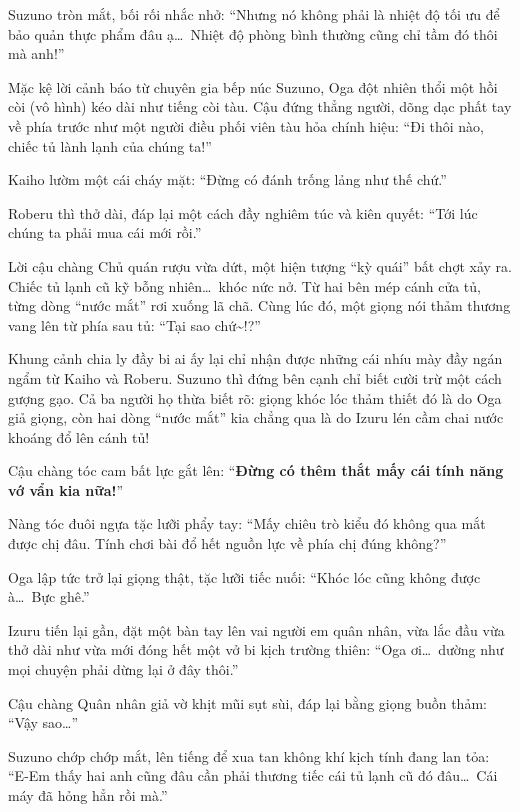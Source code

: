 \documentclass[../main.tex]{subfiles}
\begin{document}
Suzuno tròn mắt, bối rối nhắc nhở: ``Nhưng nó không phải là nhiệt độ tối ưu để bảo quản thực phẩm đâu ạ\dots\ Nhiệt độ phòng bình thường cũng chỉ tầm đó thôi mà anh!''

Mặc kệ lời cảnh báo từ chuyên gia bếp núc Suzuno, Oga đột nhiên thổi một hồi còi (vô hình) kéo dài như tiếng còi tàu. Cậu đứng thẳng người, dõng dạc phất tay về phía trước như một người điều phối viên tàu hỏa chính hiệu: ``Đi thôi nào, chiếc tủ lành lạnh của chúng ta!''


Kaiho lườm một cái cháy mặt: ``Đừng có đánh trống lảng như thế chứ.''

Roberu thì thở dài, đáp lại một cách đầy nghiêm túc và kiên quyết: ``Tới lúc chúng ta phải mua cái mới rồi.''

Lời cậu chàng Chủ quán rượu vừa dứt, một hiện tượng ``kỳ quái'' bất chợt xảy ra. Chiếc tủ lạnh cũ kỹ bỗng nhiên\dots\ khóc nức nở. Từ hai bên mép cánh cửa tủ, từng dòng ``nước mắt'' rơi xuống lã chã. Cùng lúc đó, một giọng nói thảm thương vang lên từ phía sau tủ: ``Tại sao chứ\~{}!?''

Khung cảnh chia ly đầy bi ai ấy lại chỉ nhận được những cái nhíu mày đầy ngán ngẩm từ Kaiho và Roberu. Suzuno thì đứng bên cạnh chỉ biết cười trừ một cách gượng gạo. Cả ba người họ thừa biết rõ: giọng khóc lóc thảm thiết đó là do Oga giả giọng, còn hai dòng ``nước mắt'' kia chẳng qua là do Izuru lén cầm chai nước khoáng đổ lên cánh tủ!

Cậu chàng tóc cam bất lực gắt lên: ``\textbf{Đừng có thêm thắt mấy cái tính năng vớ vẩn kia nữa!}''


Nàng tóc đuôi ngựa tặc lưỡi phẩy tay: ``Mấy chiêu trò kiểu đó không qua mắt được chị đâu. Tính chơi bài đổ hết nguồn lực về phía chị đúng không?''

Oga lập tức trở lại giọng thật, tặc lưỡi tiếc nuối: ``Khóc lóc cũng không được à\dots\ Bực ghê.''

Izuru tiến lại gần, đặt một bàn tay lên vai người em quân nhân, vừa lắc đầu vừa thở dài như vừa mới đóng hết một vở bi kịch trường thiên: ``Oga ơi\dots\ dường như mọi chuyện phải dừng lại ở đây thôi.''

Cậu chàng Quân nhân giả vờ khịt mũi sụt sùi, đáp lại bằng giọng buồn thảm: ``Vậy sao\dots''

Suzuno chớp chớp mắt, lên tiếng để xua tan không khí kịch tính đang lan tỏa: ``E-Em thấy hai anh cũng đâu cần phải thương tiếc cái tủ lạnh cũ đó đâu\dots\ Cái máy đã hỏng hẳn rồi mà.''
\end{document}
